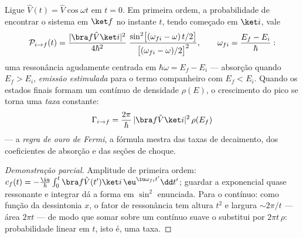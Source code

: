 \begin{theorem}\label{thm:b3:perturbation-theory:golden}
Ligue $\hat V(t) = \hat V\cos\omega t$ em $t = 0$. Em primeira ordem, a
probabilidade de encontrar o sistema em $\ket f$ no instante $t$, tendo
começado em $\ket i$, vale
\[
\mathcal P_{i\to f}(t) = \frac{|\bra f\hat V\ket i|^2}{4\hbar^2}\;
\frac{\sin^2\!\big[(\omega_{fi} - \omega)\,t/2\big]}
{\big[(\omega_{fi} - \omega)/2\big]^2} ,
\qquad \omega_{fi} = \frac{E_f - E_i}{\hbar} :
\]
uma ressonância agudamente centrada em $\hbar\omega = E_f - E_i$ ---
absorção quando $E_f > E_i$, \emph{emissão estimulada} para o termo
companheiro com $E_f < E_i$. Quando os estados finais formam um
contínuo de densidade $\rho(E)$, o crescimento do pico se torna uma
\emph{taxa} constante:
\[
\Gamma_{i\to f} = \frac{2\pi}{\hbar}\,
|\bra f\hat V\ket i|^2\,\rho(E_f)
\]
--- a \emph{regra de ouro de Fermi}, a fórmula mestra das taxas de
decaimento, dos coeficientes de absorção e das seções de choque.
\end{theorem}

\begin{proof}[Demonstração parcial]
Amplitude de primeira ordem: $c_f(t) = -\tfrac{\iu}{\hbar}\int_0^t\bra
f\hat V(t')\ket i\,\eu^{\iu\omega_{fi}t'}\dd t'$; guardar a
exponencial quase ressonante e integrar dá a forma em $\sin^2$
enunciada. Para o contínuo: como função da dessintonia $x$, o fator de
ressonância tem altura $t^2$ e largura $\sim 2\pi/t$ --- área $2\pi t$
--- de modo que somar sobre um contínuo suave o substitui por
$2\pi t\,\rho$: probabilidade linear em $t$, isto é, uma taxa.
\end{proof}

